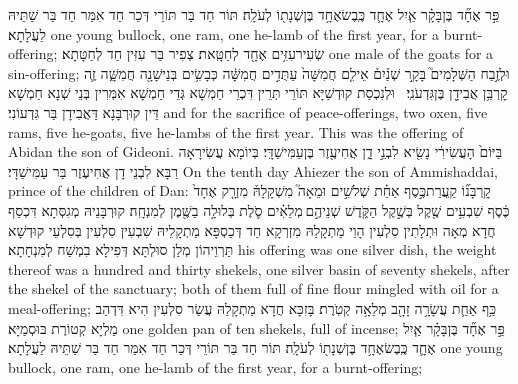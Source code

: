 {פַּ֣ר אֶחָ֞ד בֶּן\maqqaf בָּקָ֗ר אַ֧יִל אֶחָ֛ד כֶּֽבֶשׂ\maqqaf אֶחָ֥ד בֶּן\maqqaf שְׁנָת֖וֹ לְעֹלָֽה׃}
{תּוֹר חַד בַּר תּוֹרֵי דְּכַר חַד אִמַּר חַד בַּר שַׁתֵּיהּ לַעֲלָתָא׃}
{one young bullock, one ram, one he-lamb of the first year, for a burnt-offering;}{}
{שְׂעִיר\maqqaf עִזִּ֥ים אֶחָ֖ד לְחַטָּֽאת׃}
{צְפִיר בַּר עִזִּין חַד לְחַטָּתָא׃}
{one male of the goats for a sin-offering;}{}
{וּלְזֶ֣בַח הַשְּׁלָמִים֮ בָּקָ֣ר שְׁנַ֒יִם֒ אֵילִ֤ם חֲמִשָּׁה֙ עַתֻּדִ֣ים חֲמִשָּׁ֔ה כְּבָשִׂ֥ים בְּנֵי\maqqaf שָׁנָ֖ה חֲמִשָּׁ֑ה זֶ֛ה קׇרְבַּ֥ן אֲבִידָ֖ן בֶּן\maqqaf גִּדְעֹנִֽי׃ \petucha }
{וּלְנִכְסַת קוּדְשַׁיָּא תּוֹרֵי תְּרֵין דִּכְרֵי חַמְשָׁא גְּדֵי חַמְשָׁא אִמְּרִין בְּנֵי שְׁנָא חַמְשָׁא דֵּין קוּרְבָּנָא דַּאֲבִידָן בַּר גִּדְעוֹנִי׃}
{and for the sacrifice of peace-offerings, two oxen, five rams, five he-goats, five he-lambs of the first year. This was the offering of Abidan the son of Gideoni.}{}
{בַּיּוֹם֙ הָעֲשִׂירִ֔י נָשִׂ֖יא לִבְנֵ֣י דָ֑ן אֲחִיעֶ֖זֶר בֶּן\maqqaf עַמִּישַׁדָּֽי׃}
{בְּיוֹמָא עֲשִׂירָאָה רַבָּא לִבְנֵי דָן אֲחִיעֶזֶר בַּר עַמִּישַׁדָּי׃}
{On the tenth day Ahiezer the son of Ammishaddai, prince of the children of Dan:}{}
{קׇרְבָּנ֞וֹ קַֽעֲרַת\maqqaf כֶּ֣סֶף אַחַ֗ת שְׁלֹשִׁ֣ים וּמֵאָה֮ מִשְׁקָלָהּ֒ מִזְרָ֤ק אֶחָד֙ כֶּ֔סֶף שִׁבְעִ֥ים שֶׁ֖קֶל בְּשֶׁ֣קֶל הַקֹּ֑דֶשׁ שְׁנֵיהֶ֣ם \legarmeh  מְלֵאִ֗ים סֹ֛לֶת בְּלוּלָ֥ה בַשֶּׁ֖מֶן לְמִנְחָֽה׃}
{קוּרְבָּנֵיהּ מְגִסְּתָא דִּכְסַף חֲדָא מְאָה וּתְלָתִין סִלְעִין הָוֵי מַתְקָלַהּ מִזְרְקָא חַד דְּכַסְפָּא מַתְקָלֵיהּ שִׁבְעִין סִלְעִין בְּסִלְעֵי קוּדְשָׁא תַּרְוֵיהוֹן מְלַן סוּלְתָּא דְּפִילָא בִמְשַׁח לְמִנְחָתָא׃}
{his offering was one silver dish, the weight thereof was a hundred and thirty shekels, one silver basin of seventy shekels, after the shekel of the sanctuary; both of them full of fine flour mingled with oil for a meal-offering;}{}
{כַּ֥ף אַחַ֛ת עֲשָׂרָ֥ה זָהָ֖ב מְלֵאָ֥ה קְטֹֽרֶת׃}
{בָּזִכָּא חֲדָא מַתְקָלַהּ עֲשַׂר סִלְעִין הִיא דִּדְהַב מַלְיָא קְטוֹרֶת בּוּסְמַיָּא׃}
{one golden pan of ten shekels, full of incense;}{}
{פַּ֣ר אֶחָ֞ד בֶּן\maqqaf בָּקָ֗ר אַ֧יִל אֶחָ֛ד כֶּֽבֶשׂ\maqqaf אֶחָ֥ד בֶּן\maqqaf שְׁנָת֖וֹ לְעֹלָֽה׃}
{תּוֹר חַד בַּר תּוֹרֵי דְּכַר חַד אִמַּר חַד בַּר שַׁתֵּיהּ לַעֲלָתָא׃}
{one young bullock, one ram, one he-lamb of the first year, for a burnt-offering;}{}
